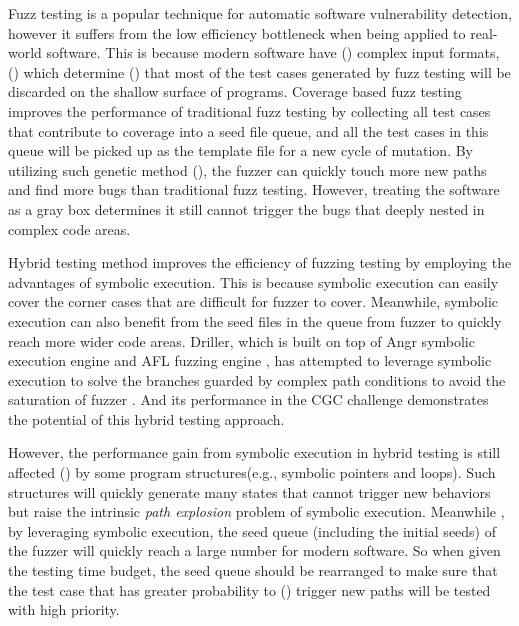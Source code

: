 

Fuzz testing is a popular technique for automatic software vulnerability detection, 
however it suffers from the low efficiency bottleneck when being applied to real-world software. 
This is because modern software have ({\color{red}{has}}) complex input formats, ({\color{red}{e.g., }}) 
 which determine ({\color{red}{such}}) that most of the test cases generated 
 by fuzz testing will be discarded on the shallow surface of programs. 
 Coverage based fuzz testing improves the performance of traditional fuzz testing 
 by collecting all test cases that contribute to coverage into a seed file queue, 
 and all the test cases in this queue will be picked up as the template file for a new cycle of mutation.
 By utilizing such genetic method 
 ({\color{red}{what is the genetic method? If this is necessary to mention, explain how it works on seed files.}}), 
 the fuzzer can quickly touch more new paths and find more bugs 
 than traditional fuzz testing. 
 However, treating the software as a gray box determines it still cannot trigger the bugs 
 that deeply nested in complex code areas.  

Hybrid testing method improves the efficiency of fuzzing testing 
 by employing the advantages of symbolic execution.
 {\color{red}{Another technique to improve the efficiency of fuzzing testing is Hybrid testing.
 In hybrid testing, symbolic execution is exploited to cover the corner cases 
 that are difficult for classical fuzzers to cover. }}
 This is because symbolic execution can easily cover the corner cases 
 that are difficult for fuzzer to cover. 
 Meanwhile, symbolic execution can also benefit from the seed files in the queue from fuzzer 
 to quickly reach more wider code areas. 
 Driller, which is built on top of Angr symbolic execution engine \cite{} and AFL fuzzing engine \cite{}, 
 has attempted to leverage symbolic execution to solve the branches guarded 
 by complex path conditions to avoid the saturation of fuzzer \cite{stephens2016driller}. 
 And its performance in the CGC challenge \cite{online:CGC} demonstrates the potential of this hybrid testing approach.

However, the performance gain from symbolic execution in hybrid testing is still affected ({\color{red}{limited}}) 
 by some program structures(e.g., symbolic pointers and loops). 
 Such structures will quickly generate many states that cannot trigger new behaviors 
 but raise the intrinsic \textit{path explosion} problem of symbolic execution.
 Meanwhile {\color{red}{Moreover}}, by leveraging symbolic execution, 
 the seed queue (including the initial seeds) of the fuzzer will quickly reach a large number for modern software. 
 So when given the testing time budget, the seed queue should be rearranged to make sure 
 that the test case that has greater probability to ({\color{red}{with greater probability of triggering}}) 
 trigger new paths will be tested with high priority.  

